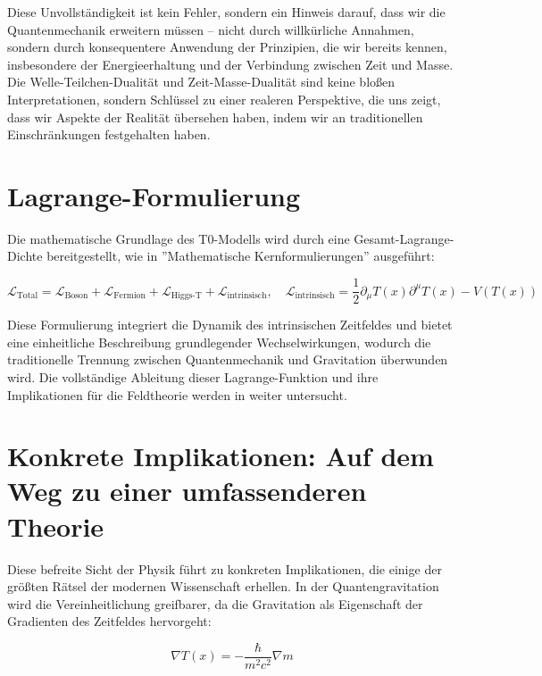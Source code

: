 \documentclass[a4paper,12pt]{article}
\newcommand{\Tfield}{T(x)}
\begin{document}
	Diese Unvollständigkeit ist kein Fehler, sondern ein Hinweis darauf, dass wir die Quantenmechanik erweitern müssen – nicht durch willkürliche Annahmen, sondern durch konsequentere Anwendung der Prinzipien, die wir bereits kennen, insbesondere der Energieerhaltung und der Verbindung zwischen Zeit und Masse. Die Welle-Teilchen-Dualität und Zeit-Masse-Dualität sind keine bloßen Interpretationen, sondern Schlüssel zu einer realeren Perspektive, die uns zeigt, dass wir Aspekte der Realität übersehen haben, indem wir an traditionellen Einschränkungen festgehalten haben.
	
	\section{Lagrange-Formulierung}
	
	Die mathematische Grundlage des T0-Modells wird durch eine Gesamt-Lagrange-Dichte bereitgestellt, wie in ''Mathematische Kernformulierungen'' \cite{pascher_lagrange_2025} ausgeführt:
	
	\begin{equation}
		\mathcal{L}_{\text{Total}} = \mathcal{L}_{\text{Boson}} + \mathcal{L}_{\text{Fermion}} + \mathcal{L}_{\text{Higgs-T}} + \mathcal{L}_{\text{intrinsisch}}, \quad \mathcal{L}_{\text{intrinsisch}} = \frac{1}{2} \partial_\mu \Tfield \partial^\mu \Tfield - V(\Tfield)
	\end{equation}
	
	Diese Formulierung integriert die Dynamik des intrinsischen Zeitfeldes und bietet eine einheitliche Beschreibung grundlegender Wechselwirkungen, wodurch die traditionelle Trennung zwischen Quantenmechanik und Gravitation überwunden wird. Die vollständige Ableitung dieser Lagrange-Funktion und ihre Implikationen für die Feldtheorie werden in \cite{pascher_feldtheorie_2025} weiter untersucht.
	
	\section{Konkrete Implikationen: Auf dem Weg zu einer umfassenderen Theorie}
	
	Diese befreite Sicht der Physik führt zu konkreten Implikationen, die einige der größten Rätsel der modernen Wissenschaft erhellen. In der Quantengravitation wird die Vereinheitlichung greifbarer, da die Gravitation als Eigenschaft der Gradienten des Zeitfeldes hervorgeht:
	
	\begin{equation}
		\nabla \Tfield = -\frac{\hbar}{m^2 c^2} \nabla m
	\end{equation}
	
\end{document}
